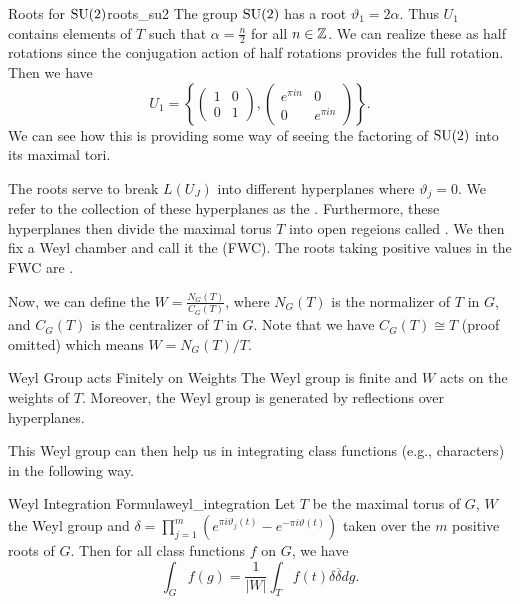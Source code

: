 \begin{ex}{Roots for $\mathrm{SU}(2)$}{roots_su2}
    The group $\mathrm{SU}(2)$ has a root $\vartheta_1=2\alpha$. Thus $U_1$ contains elements of $T$ such that $\alpha=\frac{n}{2}$ for all $n\in \mathbb{Z}$.  We can realize these as half rotations since the conjugation action of half rotations provides the full rotation.  Then we have
    \[
    U_1 = \left\{ \begin{pmatrix} 1 & 0 \\ 0 & 1 \end{pmatrix}, \begin{pmatrix} e^{\pi i n} & 0 \\ 0 & e^{\pi i n}\end{pmatrix}\right\}.
    \]
    We can see how this is providing some way of seeing the factoring of $\mathrm{SU}(2)$ into its maximal tori.  
\end{ex}

The roots serve to break $L(U_J)$ into different hyperplanes where $\vartheta_j=0$.  We refer to the collection of these hyperplanes as the . Furthermore, these hyperplanes then divide the maximal torus $T$ into open regeions called . We then fix a Weyl chamber and call it the  (FWC).  The roots taking positive values in the FWC are .

Now, we can define the  $W=\frac{N_G(T)}{C_G(T)}$, where $N_G(T)$ is the normalizer of $T$ in $G$, and $C_G(T)$ is the centralizer of $T$ in $G$.  Note that we have $C_G(T)\cong T$ (proof omitted) which means $W=N_G(T)/T$.  

\begin{prop}{Weyl Group acts Finitely on Weights}
    The Weyl group is finite and $W$ acts on the weights of $T$. Moreover, the Weyl group is generated by reflections over hyperplanes.
\end{prop}

This Weyl group can then help us in integrating class functions (e.g., characters) in the following way.

\begin{thm}{Weyl Integration Formula}{weyl_integration}
    Let $T$ be the maximal torus of $G$, $W$ the Weyl group and $\delta = \prod_{j=1}^m (e^{\pi i \vartheta_j(t)}-e^{-\pi i \vartheta(t)})$ taken over the $m$ positive roots of $G$.  Then for all class functions $f$ on $G$, we have
    \[
    \int_G f(g) = \frac{1}{|W|}\int_T f(t) \delta \overline{\delta}dg.
    \]
\end{thm}

